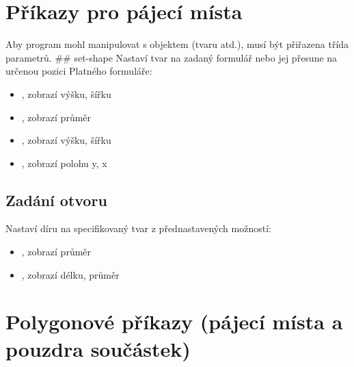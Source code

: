 \documentclass[letterpaper,10pt,czech]{sphinxmanual}
\begin{document}
\section{Příkazy pro pájecí místa}
\label{\detokenize{parameter-programs:prikazy-pro-pajeci-mista}}
Aby program mohl manipulovat s objektem (tvaru atd.),
musí být přiřazena třída parametrů. \#\# set-shape
 Nastaví tvar na zadaný
formulář nebo jej přesune na určenou pozici Platného formuláře:
\begin{itemize}
\item {} 
, zobrazí výšku, šířku

\item {} 
, zobrazí průměr

\item {} 
, zobrazí výšku, šířku

\item {} 
, zobrazí polohu y, x

\end{itemize}


\subsection{Zadání otvoru}
\label{\detokenize{parameter-programs:zadani-otvoru}}
 Nastaví díru na specifikovaný tvar z přednastavených možností:
\begin{itemize}
\item {} 
, zobrazí průměr

\item {} 
, zobrazí délku, průměr

\end{itemize}


\section{Polygonové příkazy (pájecí místa a pouzdra součástek)}
\label{\detokenize{parameter-programs:polygonove-prikazy-pajeci-mista-a-pouzdra-soucastek}}
\end{document}
